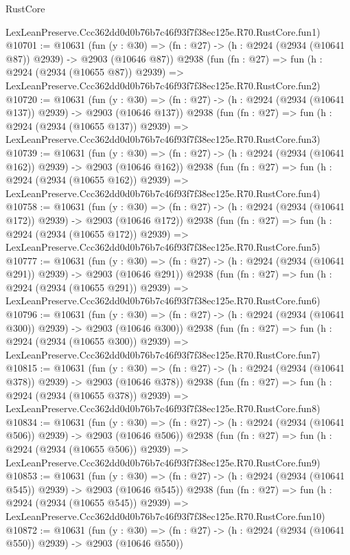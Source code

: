 \begin{lexlean}{RustCore}
\begin{coremodule}
    LexLeanPreserve.Ccc362dd0d0b76b7c46f93f7f38ec125e.R70.RustCore.fun1)
@10701 := @10631
    (fun (y : @30) => (fn : @27) -> (h : @2924 (@2934 (@10641 @87)) @2939) -> @2903 (@10646 @87))
    @2938
    (fun (fn : @27) =>
    fun (h : @2924 (@2934 (@10655 @87)) @2939) =>
    LexLeanPreserve.Ccc362dd0d0b76b7c46f93f7f38ec125e.R70.RustCore.fun2)
@10720 := @10631
    (fun (y : @30) => (fn : @27) -> (h : @2924 (@2934 (@10641 @137)) @2939) -> @2903 (@10646 @137))
    @2938
    (fun (fn : @27) =>
    fun (h : @2924 (@2934 (@10655 @137)) @2939) =>
    LexLeanPreserve.Ccc362dd0d0b76b7c46f93f7f38ec125e.R70.RustCore.fun3)
@10739 := @10631
    (fun (y : @30) => (fn : @27) -> (h : @2924 (@2934 (@10641 @162)) @2939) -> @2903 (@10646 @162))
    @2938
    (fun (fn : @27) =>
    fun (h : @2924 (@2934 (@10655 @162)) @2939) =>
    LexLeanPreserve.Ccc362dd0d0b76b7c46f93f7f38ec125e.R70.RustCore.fun4)
@10758 := @10631
    (fun (y : @30) => (fn : @27) -> (h : @2924 (@2934 (@10641 @172)) @2939) -> @2903 (@10646 @172))
    @2938
    (fun (fn : @27) =>
    fun (h : @2924 (@2934 (@10655 @172)) @2939) =>
    LexLeanPreserve.Ccc362dd0d0b76b7c46f93f7f38ec125e.R70.RustCore.fun5)
@10777 := @10631
    (fun (y : @30) => (fn : @27) -> (h : @2924 (@2934 (@10641 @291)) @2939) -> @2903 (@10646 @291))
    @2938
    (fun (fn : @27) =>
    fun (h : @2924 (@2934 (@10655 @291)) @2939) =>
    LexLeanPreserve.Ccc362dd0d0b76b7c46f93f7f38ec125e.R70.RustCore.fun6)
@10796 := @10631
    (fun (y : @30) => (fn : @27) -> (h : @2924 (@2934 (@10641 @300)) @2939) -> @2903 (@10646 @300))
    @2938
    (fun (fn : @27) =>
    fun (h : @2924 (@2934 (@10655 @300)) @2939) =>
    LexLeanPreserve.Ccc362dd0d0b76b7c46f93f7f38ec125e.R70.RustCore.fun7)
@10815 := @10631
    (fun (y : @30) => (fn : @27) -> (h : @2924 (@2934 (@10641 @378)) @2939) -> @2903 (@10646 @378))
    @2938
    (fun (fn : @27) =>
    fun (h : @2924 (@2934 (@10655 @378)) @2939) =>
    LexLeanPreserve.Ccc362dd0d0b76b7c46f93f7f38ec125e.R70.RustCore.fun8)
@10834 := @10631
    (fun (y : @30) => (fn : @27) -> (h : @2924 (@2934 (@10641 @506)) @2939) -> @2903 (@10646 @506))
    @2938
    (fun (fn : @27) =>
    fun (h : @2924 (@2934 (@10655 @506)) @2939) =>
    LexLeanPreserve.Ccc362dd0d0b76b7c46f93f7f38ec125e.R70.RustCore.fun9)
@10853 := @10631
    (fun (y : @30) => (fn : @27) -> (h : @2924 (@2934 (@10641 @545)) @2939) -> @2903 (@10646 @545))
    @2938
    (fun (fn : @27) =>
    fun (h : @2924 (@2934 (@10655 @545)) @2939) =>
    LexLeanPreserve.Ccc362dd0d0b76b7c46f93f7f38ec125e.R70.RustCore.fun10)
@10872 := @10631
    (fun (y : @30) => (fn : @27) -> (h : @2924 (@2934 (@10641 @550)) @2939) -> @2903 (@10646 @550))

\end{coremodule}
\end{lexlean}
